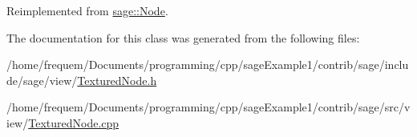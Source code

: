 Reimplemented from \mbox{\hyperlink{classsage_1_1Node_a1a5d13b9c959039084843403382f73eb}{sage\+::\+Node}}.



The documentation for this class was generated from the following files\+:\begin{DoxyCompactItemize}
\item 
/home/frequem/\+Documents/programming/cpp/sage\+Example1/contrib/sage/include/sage/view/\mbox{\hyperlink{TexturedNode_8h}{Textured\+Node.\+h}}\item 
/home/frequem/\+Documents/programming/cpp/sage\+Example1/contrib/sage/src/view/\mbox{\hyperlink{TexturedNode_8cpp}{Textured\+Node.\+cpp}}\end{DoxyCompactItemize}
